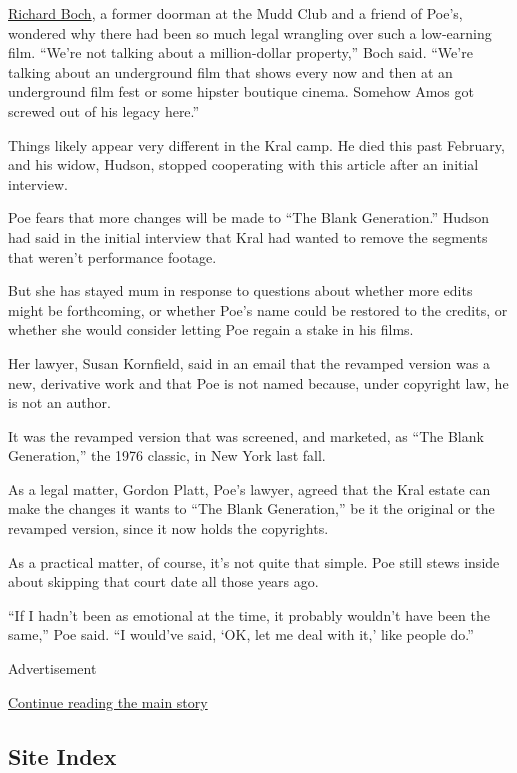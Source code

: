 \href{https://www.nytimes3xbfgragh.onion/2017/08/25/style/mudd-club-doorman-bowie-basquiat.html}{Richard
Boch}, a former doorman at the Mudd Club and a friend of Poe's, wondered
why there had been so much legal wrangling over such a low-earning film.
``We're not talking about a million-dollar property,'' Boch said.
``We're talking about an underground film that shows every now and then
at an underground film fest or some hipster boutique cinema. Somehow
Amos got screwed out of his legacy here.''

Things likely appear very different in the Kral camp. He died this past
February, and his widow, Hudson, stopped cooperating with this article
after an initial interview.

Poe fears that more changes will be made to ``The Blank Generation.''
Hudson had said in the initial interview that Kral had wanted to remove
the segments that weren't performance footage.

But she has stayed mum in response to questions about whether more edits
might be forthcoming, or whether Poe's name could be restored to the
credits, or whether she would consider letting Poe regain a stake in his
films.

Her lawyer, Susan Kornfield, said in an email that the revamped version
was a new, derivative work and that Poe is not named because, under
copyright law, he is not an author.

It was the revamped version that was screened, and marketed, as ``The
Blank Generation,'' the 1976 classic, in New York last fall.

As a legal matter, Gordon Platt, Poe's lawyer, agreed that the Kral
estate can make the changes it wants to ``The Blank Generation,'' be it
the original or the revamped version, since it now holds the copyrights.

As a practical matter, of course, it's not quite that simple. Poe still
stews inside about skipping that court date all those years ago.

``If I hadn't been as emotional at the time, it probably wouldn't have
been the same,'' Poe said. ``I would've said, `OK, let me deal with it,'
like people do.''

Advertisement

\protect\hyperlink{after-bottom}{Continue reading the main story}

\hypertarget{site-index}{%
\subsection{Site Index}\label{site-index}}

